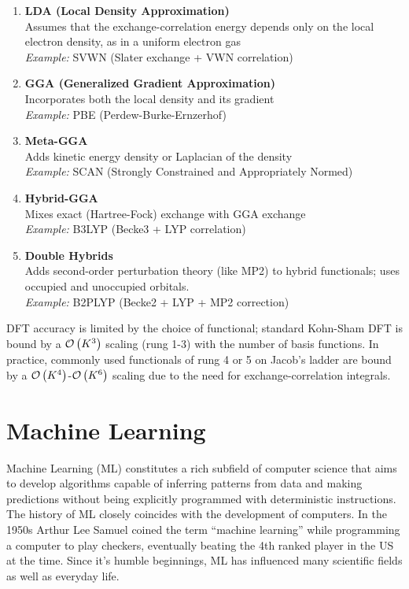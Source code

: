 \begin{enumerate}
    \item \textbf{LDA (Local Density Approximation)}\\
    Assumes that the exchange-correlation energy depends only on the local electron density, as in a uniform electron gas\\
    \textit{Example:} SVWN (Slater exchange + VWN correlation) \parencite{ref:slater1951, ref:vwn1980}

    \item \textbf{GGA (Generalized Gradient Approximation)}\\
    Incorporates both the local density and its gradient\\
    \textit{Example:} PBE (Perdew-Burke-Ernzerhof) \parencite{ref:perdew1996}

    \item \textbf{Meta-GGA}\\
    Adds kinetic energy density or Laplacian of the density\\
    \textit{Example:} SCAN (Strongly Constrained and Appropriately Normed) \parencite{ref:scan2015}

    \item \textbf{Hybrid-GGA}\\
    Mixes exact (Hartree-Fock) exchange with GGA exchange\\
    \textit{Example:} B3LYP (Becke3 + LYP correlation) \parencite{ref:lee_yang_parr_1988, ref:becke_1993}

    \item \textbf{Double Hybrids}\\
    Adds second-order perturbation theory (like MP2) to hybrid functionals; uses occupied and unoccupied orbitals.\\
    \textit{Example:} B2PLYP (Becke2 + LYP + MP2 correction) \parencite{ref:grimme2006}
\end{enumerate}
DFT accuracy is limited by the choice of functional; standard Kohn-Sham DFT is bound by a $\mathcal{O}\left(K^3\right)$ scaling (rung 1-3) with the number of basis functions. In practice, commonly used functionals of rung 4 or 5 on Jacob's ladder are bound by a $\mathcal{O}\left(K^4\right)$-$\mathcal{O}\left(K^6\right)$ scaling due to the need for exchange-correlation integrals.


\section{Machine Learning}
\label{sec:background_ml}
Machine Learning (ML) constitutes a rich subfield of computer science that aims to develop algorithms capable of inferring patterns from data and making predictions without being explicitly programmed with deterministic instructions. \\
The history of ML closely coincides with the development of computers. In the 1950s Arthur Lee Samuel coined the term ``machine learning'' while programming a computer to play checkers, eventually beating the 4th ranked player in the US at the time. \parencite{ref:knuth1989comments} Since it's humble beginnings, ML has influenced many scientific fields as well as everyday life.\\

